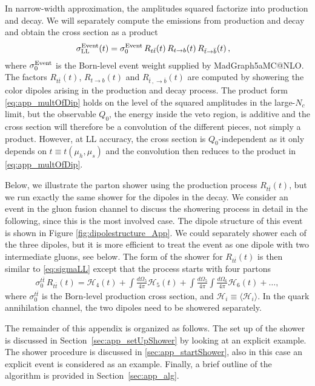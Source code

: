 \documentclass[11pt,a4paper]{article}
\begin{document}
In narrow-width approximation, the amplitudes squared factorize into production and decay. We will separately compute the emissions from production and decay and obtain the cross section as a product
\begin{align}\label{eq:app_multOfDip}
	{\sigma}^{{\rm Event}}_{{\rm LL}}(t)& = \sigma_0^{{\rm Event}} \,R_{t\bar{t}} (t)\, R_{t \to b}(t)\, R_{\bar{t} \to \bar{b}}(t) \, ,
\end{align}
where $\sigma_0^{{\rm Event}}$ is the Born-level event weight supplied by {\sc MadGraph5\Q{_}aMC@NLO}.  The factors $R_{t\bar{t}}(t)$, $R_{t \to b}(t)$ and $R_{\bar{t} \,,\to \bar{b}}(t)$ are computed by showering the color dipoles arising in the production and decay process. The product form \eqref{eq:app_multOfDip} holds on the level of the squared amplitudes in the large-$N_c$ limit, but the observable $Q_0$, the energy inside the veto region, is additive and the cross section will therefore be a convolution of the different pieces, not simply a product. However, at LL accuracy, the cross section is $Q_0$-independent as it only depends on $t\equiv t(\mu_h, \mu_s)$ and the convolution then reduces to the product in \eqref{eq:app_multOfDip}.

Below, we illustrate the parton shower using the production process $R_{t\bar{t}} (t)$, but we run exactly the same shower for the dipoles in the decay.  We consider  an event in the gluon fusion channel to discuss the showering process in detail in the following, since this is the most involved case. The dipole structure of this event is shown in Figure \ref{fig:dipolestructure_App}. We could separately shower each of the three dipoles, but it is more efficient to treat the event as one dipole with two intermediate gluons, see below. The form of the shower for $R_{t \bar{t}}(t)$ is then similar to \eqref{eq:sigmaLL} except that the process starts with four partons
\begin{align}\label{eq:Rttb}
 \sigma_0^{t\bar{t} }\, R_{t \bar{t}}(t)=\mathcal{H}_4(t) + \int \frac{d\Omega_5}{4\pi} \mathcal{H}_{5}(t) +\int \frac{d\Omega_5}{4\pi}\int \frac{d\Omega_6}{4\pi}  \mathcal{H}_{6}(t) + \dots,
\end{align}
where $\sigma_0^{t\bar{t} }$ is the Born-level production cross section, and $\mathcal{H}_i \equiv \langle \bm{\mathcal{H}}_i \rangle$.
In the quark annihilation channel, the two dipoles need to be showered separately.

The remainder of this appendix is organized as follows. The set up of the shower is discussed in Section~\ref{sec:app_setUpShower} by looking at an explicit example. The shower procedure is discussed in \ref{sec:app_startShower}, also in this case an explicit event is considered as an example. 
Finally, a brief outline of the algorithm is provided in Section~\ref{sec:app_alg}.
\end{document}
